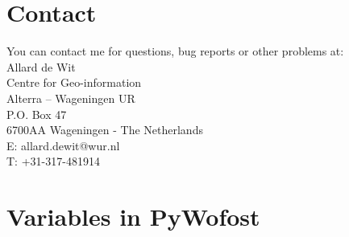 \documentclass[12pt]{article}
\begin{document}
\section{Contact}

You can contact me for questions, bug reports or other problems at:\\
Allard de Wit\\
Centre for Geo-information\\
Alterra -- Wageningen UR\\
P.O. Box 47\\
6700AA Wageningen - The Netherlands\\
E: allard.dewit@wur.nl\\
T: +31-317-481914\\

\section{Variables in PyWofost}
\end{document}
